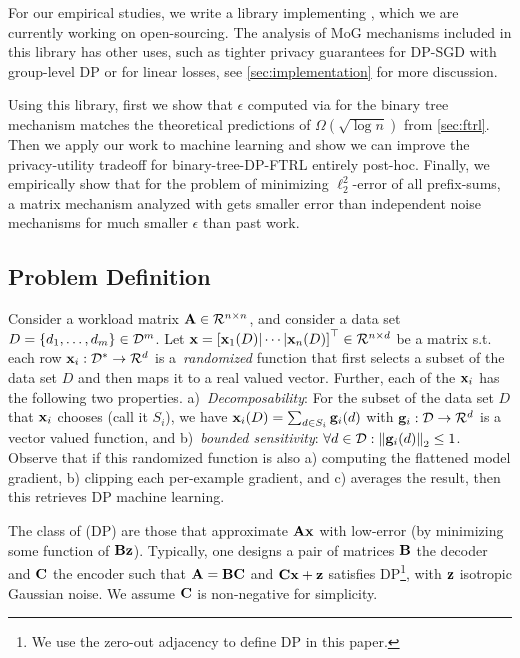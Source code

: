  For our empirical studies, we write a library implementing \MMCC{}, which we are currently working on open-sourcing. The analysis of MoG mechanisms included in this library has other uses, such as tighter privacy guarantees for DP-SGD with group-level DP or for linear losses, see \cref{sec:implementation} for more discussion.

Using this library, first we show that $\epsilon$ computed via \MMCC{} for the binary tree mechanism matches the theoretical predictions of $\Omega(\sqrt{\log n})$ from \cref{sec:ftrl}. Then we apply our work to machine learning and show we can improve the privacy-utility tradeoff for binary-tree-DP-FTRL \citep{kairouz2021practical} entirely post-hoc. Finally, we empirically show that for the problem of minimizing $\ell_2^2$-error of all prefix-sums, a matrix mechanism analyzed with \MMCC{} gets smaller error than independent noise mechanisms for much smaller $\epsilon$ than past work. 

\subsection{Problem Definition}
\label{sec:probdef}

 Consider a workload matrix $\mathbf{A}\in\mathcal{R}^{n\times n}$, and consider a data set $D=\{d_1,\ldots,d_m\}\in\mathcal{D}^m$. Let $\mathbf{x}=\left[\mathbf{x}_1(D)|\cdots|\mathbf{x}_n(D)\right]^\top\in\mathcal{R}^{n\times d}$ be a matrix s.t. each row $\mathbf{x}_i:\mathcal{D}^*\to\mathcal{R}^{d}$ is a~\emph{randomized} function that first selects a subset of the data set $D$ and then maps it to a real valued vector.
Further, each of the $\mathbf{x}_i$ has the following two properties. a)~\emph{Decomposability}: For the subset of the data set $D$ that $\mathbf{x}_i$ chooses (call it $S_i$), we have $\mathbf{x}_i(D)=\sum_{d\in S_i}\mathbf{g}_i(d)$ with $\mathbf{g}_i:\mathcal{D}\to\mathcal{R}^{d}$ is a vector valued function,
and b)~\emph{bounded sensitivity}: $\forall d\in\mathcal{D}: \left\|\mathbf{g}_i(d)\right\|_2\leq 1$. Observe that if this randomized function is also a) computing the flattened model gradient, b) clipping each per-example gradient, and c) averages the result, then this retrieves DP machine learning.

The class of (DP) \mm are those that approximate $\mathbf{A}\mathbf{x}$ with low-error (by minimizing some function of $\mathbf{B}\mathbf{z}$). Typically, one designs a pair of matrices $\mathbf{B}$ the decoder and $\mathbf{C}$ the encoder such that $\mathbf{A}=\mathbf{B}\mathbf{C}$ and $\mathbf{C}\mathbf{x}+\mathbf{z}$ satisfies DP\footnote{We use the zero-out adjacency \citep{ponomareva2023dpfy} to define DP in this paper.}, with $\mathbf{z}$ isotropic Gaussian noise. We assume $\mathbf{C}$ is non-negative for simplicity.

